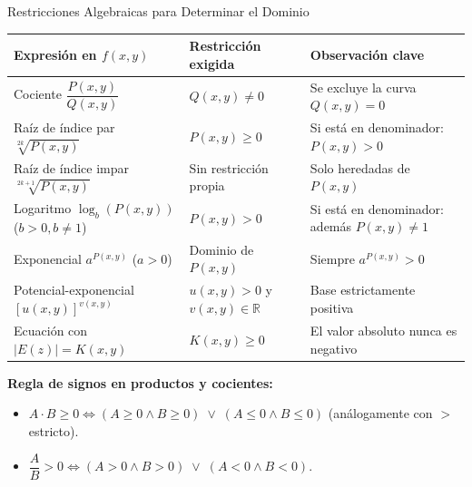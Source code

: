 \documentclass[aspectratio=169, 10pt]{beamer}
\begin{document}
\begin{frame}{Restricciones Algebraicas para Determinar el Dominio}
  \begin{table}
    \centering
    \setlength{\tabcolsep}{3pt}
    \footnotesize
    \begin{tabular}{p{4.2cm} p{4.2cm} p{4.6cm}}
      \toprule
      \textbf{Expresión en $f(x,y)$} & \textbf{Restricción exigida} & \textbf{Observación clave} \\
      \midrule
      Cociente $\dfrac{P(x,y)}{Q(x,y)}$ & $Q(x,y) \neq 0$ & Se excluye la curva $Q(x,y)=0$ \\
      \addlinespace
      Raíz de índice par $\sqrt[2k]{P(x,y)}$ & $P(x,y) \ge 0$ & Si está en denominador: $P(x,y) > 0$ \\
      \addlinespace
      Raíz de índice impar $\sqrt[2k+1]{P(x,y)}$ & Sin restricción propia & Solo heredadas de $P(x,y)$ \\
      \addlinespace
      Logaritmo $\log_b(P(x,y))$ ($b>0, b\neq 1$) & $P(x,y) > 0$ & Si está en denominador: además $P(x,y) \neq 1$ \\
      \addlinespace
      Exponencial $a^{P(x,y)}$ ($a>0$) & Dominio de $P(x,y)$ & Siempre $a^{P(x,y)} > 0$ \\
      \addlinespace
      Potencial-exponencial $[u(x,y)]^{v(x,y)}$ & $u(x,y) > 0$ y $v(x,y) \in \mathbb{R}$ & Base estrictamente positiva \\
      \addlinespace
      Ecuación con $|E(z)| = K(x,y)$ & $K(x,y) \ge 0$ & El valor absoluto nunca es negativo \\
      \bottomrule
    \end{tabular}
  \end{table}

  \vspace{0.15cm}
  \textbf{Regla de signos en productos y cocientes:}
  \begin{itemize}
    \item $A \cdot B \ge 0 \iff (A \ge 0 \wedge B \ge 0) \;\vee\; (A \le 0 \wedge B \le 0)$ \qquad (análogamente con $>$ estricto).
    \item $\dfrac{A}{B} > 0 \iff (A > 0 \wedge B > 0) \;\vee\; (A < 0 \wedge B < 0)$.
  \end{itemize}
\end{frame}
\end{document}
